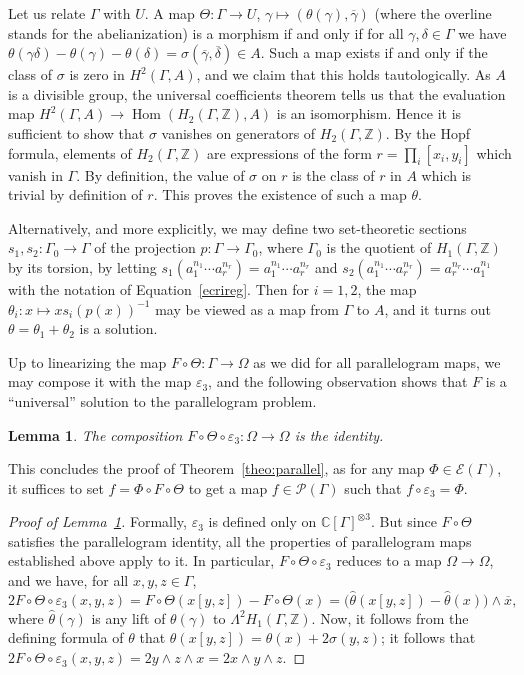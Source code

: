 \documentclass[JEP,XML,SOM,Unicode,NoEqCountersInSection]{cedram}
\let\mathcal\mathscr
\newtheorem{lemma}[theorem]{Lemma}
\theoremstyle{definition}
\newcommand{\ZZ}{\mathbb{Z}}
\newcommand{\CC}{\mathbb{C}}
\newcommand{\Hom}{\operatorname{Hom}}
\begin{document}
Let us relate $\Gamma$ with $U$. A map $\Theta\colon\Gamma\to U$,
$\gamma\mapsto(\theta(\gamma),\overline{\gamma})$ (where the overline stands
for the abelianization) is a morphism if and only if for all
$\gamma,\delta\in\Gamma$ we have
$\theta(\gamma\delta)-\theta(\gamma)-\theta(\delta)=
\sigma(\overline{\gamma},\overline{\delta})\in A$.
Such a map exists if and only if the class of $\sigma$ is zero in
$H^2(\Gamma,A)$, and we claim that this holds tautologically.
As $A$ is a divisible group, the universal coefficients theorem tells
us that the evaluation map $H^2(\Gamma,A)\to\Hom(H_2(\Gamma,\ZZ),A)$
is an isomorphism. Hence it is sufficient to show that $\sigma$ vanishes on
generators of $H_2(\Gamma,\ZZ)$. By the Hopf formula, elements of
$H_2(\Gamma,\ZZ)$ are expressions of the form $r=\prod_i[x_i,y_i]$ which
vanish in $\Gamma$. By definition, the value of $\sigma$ on $r$ is the class
of $r$ in $A$ which is trivial by definition of $r$.
This proves the existence of such a map $\theta$.

Alternatively, and more explicitly, we may define two set-theoretic sections
$s_1,s_2\colon \Gamma_0\to\Gamma$ of the projection
$p\colon \Gamma\to\Gamma_0$, where $\Gamma_0$ is the quotient of
$H_1(\Gamma,\ZZ)$ by its torsion, by letting
$s_1(a_1^{n_1}\cdots a_r^{n_r})=a_1^{n_1}\cdots a_r^{n_r}$
and $s_2(a_1^{n_1}\cdots a_r^{n_r})=a_r^{n_r}\cdots a_1^{n_1}$ with
the notation of Equation~\eqref{ecrireg}. Then for $i=1,2$,
the map $\theta_i\colon x\mapsto x s_i(p(x))^{-1}$ may be viewed as a
map from $\Gamma$ to $A$, and it turns out $\theta=\theta_1+\theta_2$
is a solution.

Up to linearizing the map $F\circ\Theta\colon\Gamma\to\Omega$ as we did for
all parallelogram maps, we may compose it with the map $\varepsilon_3$, and
the following observation shows that $F$ is a ``universal'' solution
to the parallelogram problem.
\begin{lemma}\label{lem:id}
The composition $F\circ\Theta\circ\varepsilon_3\colon\Omega\to\Omega$
is the identity.
\end{lemma}
This concludes the proof of Theorem~\ref{theo:parallel}, as for any map
$\Phi\in\mathcal{E}(\Gamma)$, it suffices to set $f=\Phi\circ F\circ\Theta$
to get a map $f\in\mathcal{P}(\Gamma)$ such that $f\circ\varepsilon_3=\Phi$.
\begin{proof}[Proof of Lemma~\ref{lem:id}]
Formally, $\varepsilon_3$ is defined only on $\CC[\Gamma]^{\otimes 3}$.
But since $F\circ\Theta$ satisfies the parallelogram identity,
all the properties of parallelogram maps established above apply
to it. In particular, $F\circ\Theta\circ\varepsilon_3$ reduces to
a map $\Omega\to\Omega$, and we have, for all $x,y,z\in\Gamma$,
\[
2F\circ\Theta\circ\varepsilon_3(x,y,z)=
F\circ\Theta(x[y,z])-F\circ\Theta(x) =
\bigl(\widehat{\theta}(x[y,z])-\widehat{\theta}(x)\bigr)\wedge\overline{x},
\]
where $\widehat{\theta}(\gamma)$ is any lift of $\theta(\gamma)$ to
$\Lambda^2H_1(\Gamma,\ZZ)$.
Now, it follows from the defining formula of $\theta$ that
$\theta(x[y,z])=\theta(x)+2\sigma(y,z)$; it follows that
$2F\circ\Theta\circ\varepsilon_3(x,y,z)=
2y\wedge z\wedge x=2x\wedge y\wedge z$.
\end{proof}
\end{document}
